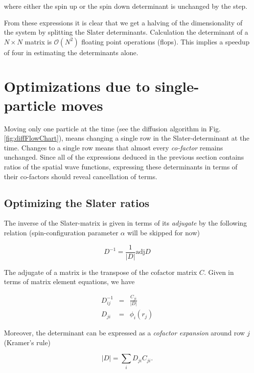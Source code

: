 where either the spin up or the spin down determinant is unchanged by the step. 

From these expressions it is clear that we get a halving of the dimensionality of the system by splitting the Slater determinants. Calculation the determinant of a $N\times N$ matrix is $\mathcal{O}(N^2)$ floating point operations (flops). This implies a speedup of four in estimating the determinants alone. 

\section{Optimizations due to single-particle moves}

Moving only one particle at the time (see the diffusion algorithm in Fig. \ref{fig:diffFlowChart}), means changing a single row in the Slater-determinant at the time. Changes to a single row means that almost every \textit{co-factor} remains unchanged. Since all of the expressions deduced in the previous section contains ratios of the spatial wave functions, expressing these determinants in terms of their co-factors should reveal cancellation of terms. 

\subsection{Optimizing the Slater ratios}

The inverse of the Slater-matrix is given in terms of its \textit{adjugate} by the following relation \cite{linAlg} (spin-configuration parameter $\alpha$ will be skipped for now)

\begin{equation*}
 D^{-1} = \frac{1}{|D|}\mathrm{adj} D
\end{equation*}

The adjugate of a matrix is the transpose of the cofactor matrix $C$. Given in terms of matrix element equations, we have

\begin{eqnarray}
 D^{-1}_{ij} &=& \frac{C_{ji}}{|D|}\label{eq:invExpCofac} \\
 D_{ji} &=& \phi_i(r_j) \label{eq:slaterMatPhi}
\end{eqnarray}

Moreover, the determinant can be expressed as a \textit{cofactor expansion} around row $j$ (Kramer's rule)

\begin{equation}
\label{eq:cofacExp}
 |D| = \sum_i D_{ji} C_{ji}.
\end{equation}

